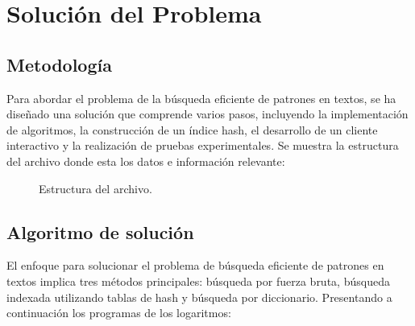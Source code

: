 \documentclass[12pt, twoside]{article}
\begin{document}
\section{Solución del Problema}

\subsection{Metodología}
Para abordar el problema de la búsqueda eficiente de patrones en textos, se ha diseñado una solución que comprende varios pasos, incluyendo la implementación de algoritmos, la construcción de un índice hash, el desarrollo de un cliente interactivo y la realización de pruebas experimentales.
\newline
\newline
Se muestra la estructura  del archivo donde esta los datos e información relevante:

\begin{figure}[h]
\caption{Estructura del archivo.}
\label{fig_estructura}
\end{figure}


\subsection{Algoritmo de solución}
El enfoque para solucionar el problema de búsqueda eficiente de patrones en textos implica tres métodos principales: búsqueda por fuerza bruta, búsqueda indexada utilizando tablas de hash y búsqueda por diccionario. Presentando a continuación los programas de los logaritmos:
\end{document}
